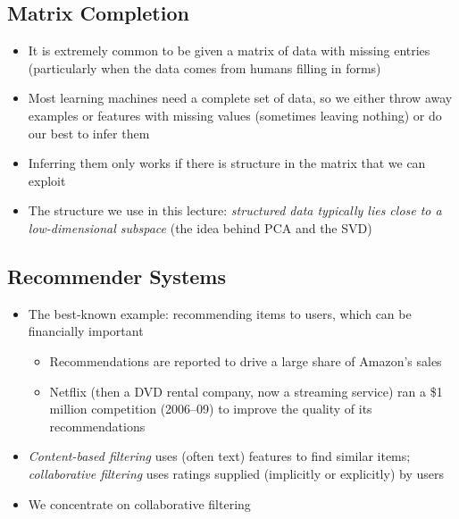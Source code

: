 \begin{slide}
\section{Matrix Completion}

\begin{PauseHighLight}
  \begin{itemize}
  \item It is extremely common to be given a matrix of data with
    missing entries\pause{} (particularly when the data comes from
    humans filling in forms)\pause
  \item Most learning machines need a complete set of data, so we
    either throw away examples or features with missing values
    (sometimes leaving nothing) or do our best to infer them\pause
  \item Inferring them only works if there is structure in the matrix
    that we can exploit\pause
  \item The structure we use in this lecture: \emph{structured data
      typically lies close to a low-dimensional subspace}\pause{}
    (the idea behind PCA and the SVD)\pause
  \end{itemize}
\end{PauseHighLight}

\end{slide}


\begin{slide}
\section{Recommender Systems}

\begin{PauseHighLight}
\begin{itemize}\squeeze
\item The best-known example: recommending items to users, which can
  be financially important
  \begin{itemize}
  \item Recommendations are reported to drive a large share of
    Amazon's sales\pause
  \item Netflix (then a DVD rental company, now a streaming service)
    ran a \$1 million competition (2006--09) to improve the quality of
    its recommendations\pause
  \end{itemize}
\item \emph{Content-based filtering} uses (often text) features to
  find similar items; \emph{collaborative filtering} uses ratings
  supplied (implicitly or explicitly) by users\pause
\item We concentrate on collaborative filtering\pause
\end{itemize}
\end{PauseHighLight}
\end{slide}

